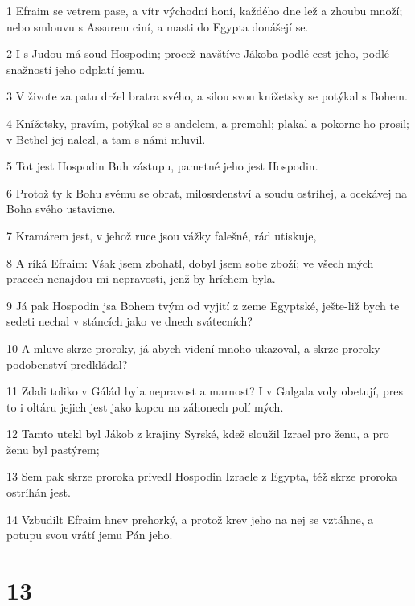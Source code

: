 \par 1 Efraim se vetrem pase, a vítr východní honí, každého dne lež a zhoubu množí; nebo smlouvu s Assurem ciní, a masti do Egypta donášejí se.
\par 2 I s Judou má soud Hospodin; procež navštíve Jákoba podlé cest jeho, podlé snažností jeho odplatí jemu.
\par 3 V živote za patu držel bratra svého, a silou svou knížetsky se potýkal s Bohem.
\par 4 Knížetsky, pravím, potýkal se s andelem, a premohl; plakal a pokorne ho prosil; v Bethel jej nalezl, a tam s námi mluvil.
\par 5 Tot jest Hospodin Buh zástupu, pametné jeho jest Hospodin.
\par 6 Protož ty k Bohu svému se obrat, milosrdenství a soudu ostríhej, a ocekávej na Boha svého ustavicne.
\par 7 Kramárem jest, v jehož ruce jsou vážky falešné, rád utiskuje,
\par 8 A ríká Efraim: Však jsem zbohatl, dobyl jsem sobe zboží; ve všech mých pracech nenajdou mi nepravosti, jenž by hríchem byla.
\par 9 Já pak Hospodin jsa Bohem tvým od vyjití z zeme Egyptské, ješte-liž bych te sedeti nechal v stáncích jako ve dnech svátecních?
\par 10 A mluve skrze proroky, já abych videní mnoho ukazoval, a skrze proroky podobenství predkládal?
\par 11 Zdali toliko v Gálád byla nepravost a marnost? I v Galgala voly obetují, pres to i oltáru jejich jest jako kopcu na záhonech polí mých.
\par 12 Tamto utekl byl Jákob z krajiny Syrské, kdež sloužil Izrael pro ženu, a pro ženu byl pastýrem;
\par 13 Sem pak skrze proroka privedl Hospodin Izraele z Egypta, též skrze proroka ostríhán jest.
\par 14 Vzbudilt Efraim hnev prehorký, a protož krev jeho na nej se vztáhne, a potupu svou vrátí jemu Pán jeho.

\chapter{13}

